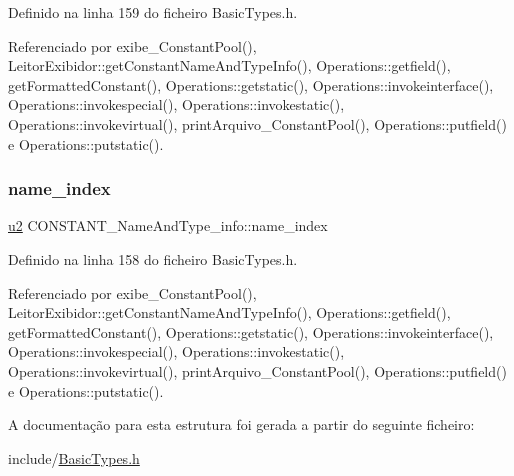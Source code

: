 Definido na linha 159 do ficheiro Basic\+Types.\+h.



Referenciado por exibe\+\_\+\+Constant\+Pool(), Leitor\+Exibidor\+::get\+Constant\+Name\+And\+Type\+Info(), Operations\+::getfield(), get\+Formatted\+Constant(), Operations\+::getstatic(), Operations\+::invokeinterface(), Operations\+::invokespecial(), Operations\+::invokestatic(), Operations\+::invokevirtual(), print\+Arquivo\+\_\+\+Constant\+Pool(), Operations\+::putfield() e Operations\+::putstatic().

\mbox{\label{structCONSTANT__NameAndType__info_adbaa813f9f3a32dc04a8bc65b5b2433d}} 
\subsubsection{\texorpdfstring{name\+\_\+index}{name\_index}}
{\footnotesize\ttfamily \hyperlink{BasicTypes_8h_a732cde1300aafb73b0ea6c2558a7a54f}{u2} C\+O\+N\+S\+T\+A\+N\+T\+\_\+\+Name\+And\+Type\+\_\+info\+::name\+\_\+index}



Definido na linha 158 do ficheiro Basic\+Types.\+h.



Referenciado por exibe\+\_\+\+Constant\+Pool(), Leitor\+Exibidor\+::get\+Constant\+Name\+And\+Type\+Info(), Operations\+::getfield(), get\+Formatted\+Constant(), Operations\+::getstatic(), Operations\+::invokeinterface(), Operations\+::invokespecial(), Operations\+::invokestatic(), Operations\+::invokevirtual(), print\+Arquivo\+\_\+\+Constant\+Pool(), Operations\+::putfield() e Operations\+::putstatic().



A documentação para esta estrutura foi gerada a partir do seguinte ficheiro\+:\begin{DoxyCompactItemize}
\item 
include/\hyperlink{BasicTypes_8h}{Basic\+Types.\+h}\end{DoxyCompactItemize}
